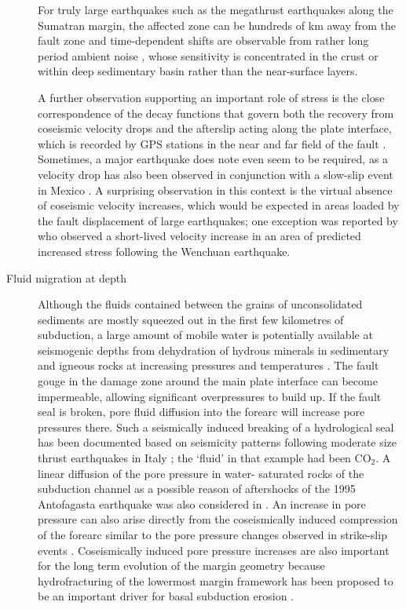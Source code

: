 \documentclass[11pt]{article}
\newcommand{\note}[1]{{\it \color{red} #1}}
\newcommand{\noteft}[1]{{\it \color{magenta} FT:#1}}
\newcommand{\note}[1]{}
\newcommand{\noteft}[1]{}
\begin{document}
\begin{description}
For truly large earthquakes such as the megathrust earthquakes along the Sumatran margin, the affected zone can be hundreds of km away from the fault zone and time-dependent shifts are observable from rather long period ambient noise \citep[e.g. 4-50 s in][]{xu09}, whose sensitivity is concentrated in the crust or within deep sedimentary basin rather than the near-surface layers.%

 A further observation supporting an important role of stress is the close correspondence of the decay functions that govern both the recovery from coseismic velocity drops and the  afterslip acting along the plate interface, which is recorded by GPS stations in the near and far field of the fault \citep{brenguier_etal_Science_08}. Sometimes, a major earthquake does note even seem to be required, as a velocity drop has also been observed in conjunction with a slow-slip event in Mexico \citep{rivet_etal_GRL_11}. A surprising observation in this context is the virtual absence of coseismic velocity increases, which would be expected in areas loaded by the fault displacement of large earthquakes; one exception was reported by \citet{zhao12} who observed a short-lived velocity increase in an area of predicted increased stress following the Wenchuan earthquake.   
 
 
 \item[Fluid migration at depth]

	 Although the fluids contained between the grains of unconsolidated sediments are mostly squeezed out in the first few kilometres of subduction, a large amount of mobile water is potentially available at seismogenic depths from dehydration of hydrous minerals in sedimentary and igneous rocks %
	 at increasing pressures and temperatures \citep{hacker03b}. The fault gouge in the damage zone around the main plate interface can become impermeable, allowing significant overpressures to build up. If the fault seal is broken, pore fluid diffusion into the forearc will increase pore pressures there.
	 Such a seismically induced breaking of a hydrological seal has been documented based on seismicity patterns following moderate size thrust earthquakes in Italy \citep{miller04}; the `fluid' in that example had been CO$_2$.
	 A linear diffusion of the pore pressure in water- saturated rocks of the subduction channel as  a possible reason of aftershocks of the 1995 Antofagasta earthquake was also considered in \cite{shapiro:2003}.
An increase in pore pressure can also arise directly from the coseismically induced compression of the forearc similar to the pore pressure changes observed in strike-slip events \citep{Jonsson2003}.
 Coseismically induced pore pressure increases are also important for the long term evolution of the margin geometry because hydrofracturing of the lowermost margin framework has been proposed to be an important driver for basal subduction erosion \citep[e.g.,][]{ranero08,sallares05}. 
 

\end{description}
\end{document}
